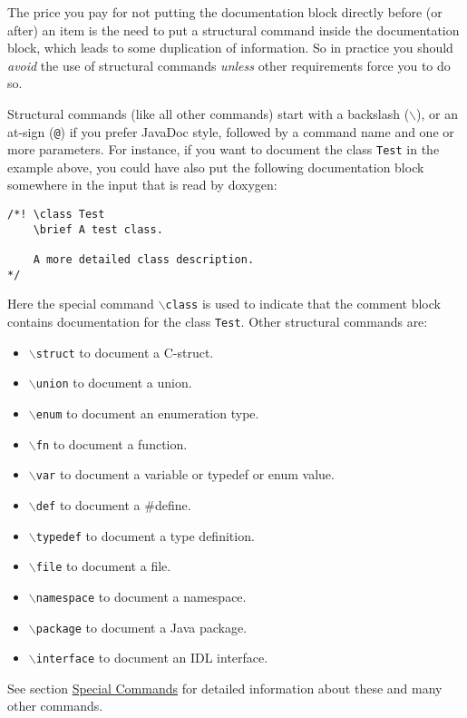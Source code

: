 The price you pay for not putting the documentation block directly before (or after) an item is the need to put a structural command inside the documentation block, which leads to some duplication of information. So in practice you should {\em avoid\/} the use of structural commands {\em unless\/} other requirements force you to do so.

Structural commands (like all other commands) start with a backslash ({\tt $\backslash$}), or an at-sign ({\tt @}) if you prefer JavaDoc style, followed by a command name and one or more parameters. For instance, if you want to document the class {\tt Test} in the example above, you could have also put the following documentation block somewhere in the input that is read by doxygen: 

\footnotesize\begin{verbatim}
/*! \class Test
    \brief A test class.

    A more detailed class description.
*/
\end{verbatim}
\normalsize


Here the special command {\tt $\backslash$class} is used to indicate that the comment block contains documentation for the class {\tt Test}. Other structural commands are: \begin{itemize}
\item {\tt $\backslash$struct} to document a C-struct. \item {\tt $\backslash$union} to document a union. \item {\tt $\backslash$enum} to document an enumeration type. \item {\tt $\backslash$fn} to document a function. \item {\tt $\backslash$var} to document a variable or typedef or enum value. \item {\tt $\backslash$def} to document a \#define. \item {\tt $\backslash$typedef} to document a type definition. \item {\tt $\backslash$file} to document a file. \item {\tt $\backslash$namespace} to document a namespace. \item {\tt $\backslash$package} to document a Java package. \item {\tt $\backslash$interface} to document an IDL interface. \end{itemize}
See section \hyperlink{commands}{Special Commands} for detailed information about these and many other commands.

